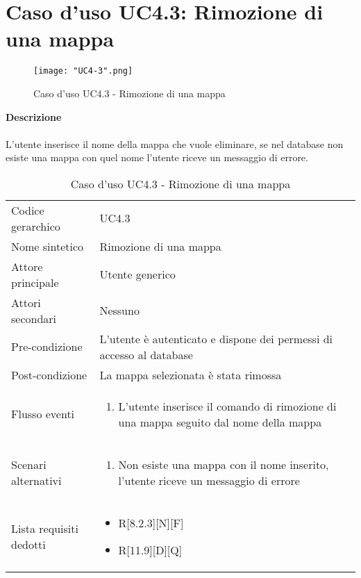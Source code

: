 \documentclass[a4paper]{report}
\begin{document}
	 \section{Caso d'uso UC4.3: Rimozione di una mappa}
	 \begin{figure}[H]
			\centering
			\texttt{[image: "UC4-3".png]}
			\caption{Caso d'uso UC4.3 - Rimozione di una mappa}
		\end{figure}
	 \textbf{Descrizione} \\ \\
	 L'utente inserisce il nome della mappa che vuole eliminare, se nel database non esiste una mappa con
	 quel nome l'utente riceve un messaggio di errore.
		\begin{table}[H]
		\begin{tabularx}{\textwidth}{X | X}\toprule
			\rowcolor{orange!65}Codice gerarchico & UC4.3\\
			Nome sintetico & Rimozione di una mappa\\
			\rowcolor{orange!65}Attore principale & Utente generico\\
			Attori secondari & Nessuno \\
			\rowcolor{orange!65}Pre-condizione & L'utente è autenticato e dispone dei permessi di accesso
			al database\\
			Post-condizione & La mappa selezionata è stata rimossa\\
			\rowcolor{orange!65}Flusso eventi & \begin{enumerate}
			\item L'utente inserisce il comando di rimozione di una mappa seguito dal nome della mappa
			\end{enumerate} \\
			Scenari alternativi & \begin{enumerate}
			\item Non esiste una mappa con il nome inserito, l'utente riceve un messaggio di errore
			\end{enumerate} \\
			\rowcolor{orange!65}Lista requisiti dedotti & \begin{itemize}
				\item R[8.2.3][N][F]
				\item R[11.9][D][Q]
				\end{itemize} \\
			\bottomrule
		\end{tabularx}
		\caption{Caso d'uso UC4.3 - Rimozione di una mappa}
	 \end{table}
\end{document}
